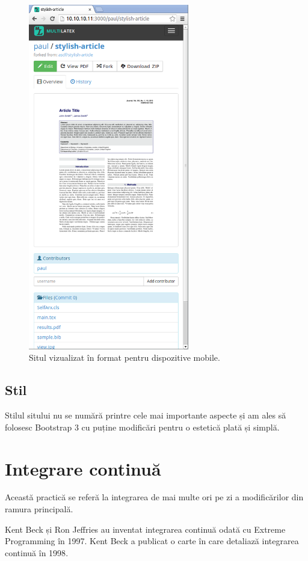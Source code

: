 \documentclass[a4wide,12pt]{report}
\begin{document}
\begin{figure}
\begin{center}
\includegraphics[width=7cm]{imagini/mobile}
\end{center}
\caption{Situl vizualizat în format pentru dispozitive mobile.}
\label{mobilesitefig}
\end{figure}

\subsection{Stil}

Stilul sitului nu se numără printre cele mai importante aspecte și am ales să
folosesc Bootstrap 3 cu puține modificări pentru o estetică plată și simplă.

\section{Integrare continuă}

Această practică se referă la integrarea de mai multe ori pe zi a modificărilor
din ramura principală.

Kent Beck și Ron Jeffries au inventat integrarea continuă odată cu Extreme
Programming în 1997. Kent Beck a publicat o carte în care detaliază integrarea
continuă în 1998\cite{contint}.
\end{document}
